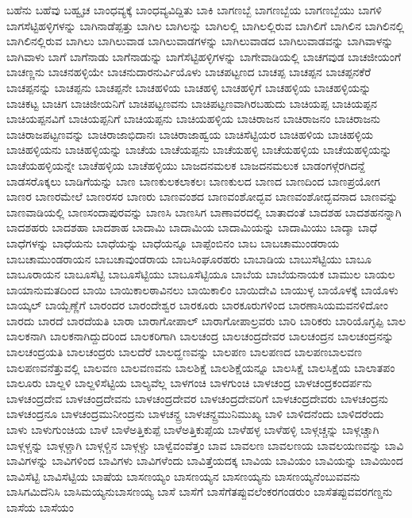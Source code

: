 {ಬಹೆನು
ಬಹೆವು
ಬಹ್ವೃಚ
ಬಾಂಧವ್ಯಕ್ಕೆ
ಬಾಂಧವ್ಯವಿದ್ದಿತು
ಬಾಕಿ
ಬಾಗಣಬ್ಬೆ
ಬಾಗಣಬ್ಬೆಯ
ಬಾಗಣಬ್ಬೆಯು
ಬಾಗಳಿ
ಬಾಗಸೆಟ್ಟಿಹಳ್ಳಿಗಳನ್ನು
ಬಾಗಿನಾಡೆಪ್ಪತ್ತು
ಬಾಗಿಲ
ಬಾಗಿಲನ್ನು
ಬಾಗಿಲಲ್ಲಿ
ಬಾಗಿಲಲ್ಲಿರುವ
ಬಾಗಿಲಿಗೆ
ಬಾಗಿಲಿನ
ಬಾಗಿಲಿನಲ್ಲಿ
ಬಾಗಿಲಿನಲ್ಲಿರುವ
ಬಾಗಿಲು
ಬಾಗಿಲುವಾಡ
ಬಾಗಿಲುವಾಡಗಳನ್ನು
ಬಾಗಿಲುವಾಡದ
ಬಾಗಿಲುವಾಡವನ್ನು
ಬಾಗಿವಾಳನ್ನು
ಬಾಗಿವಾಳು
ಬಾಗೆ
ಬಾಗೆನಾಡು
ಬಾಗೆನಾಡುನ್ನು
ಬಾಗೆಸೆಟ್ಟಿಹಳ್ಳಿಗಳನ್ನು
ಬಾಗೇವಾಡಿಯಲ್ಲಿ
ಬಾಚಗವುಡ
ಬಾಚಜೀಯಂಗೆ
ಬಾಚಣ್ಣನು
ಬಾಚನಹಳ್ಳಿಯೇ
ಬಾಚನುದಾರನುರ್ವಿಯೊಳು
ಬಾಚಪಟ್ಟಣದ
ಬಾಚಪ್ಪ
ಬಾಚಪ್ಪನ
ಬಾಚಪ್ಪನಕೆರೆ
ಬಾಚಪ್ಪನನ್ನು
ಬಾಚಪ್ಪನು
ಬಾಚಪ್ಪನೇ
ಬಾಚಹಳಿಯ
ಬಾಚಹಳ್ಳಿ
ಬಾಚಹಳ್ಳಿಗೆ
ಬಾಚಹಳ್ಳಿಯ
ಬಾಚಹಳ್ಳಿಯನ್ನು
ಬಾಚಿಕಟ್ಟ
ಬಾಚಿಗ
ಬಾಚಿಜೀಯನಿಗೆ
ಬಾಚಿಪಟ್ಟಣವನು
ಬಾಚಿಪಟ್ಟಣವಾಗಿರಬಹುದು
ಬಾಚಿಯಪ್ಪ
ಬಾಚಿಯಪ್ಪನ
ಬಾಚಿಯಪ್ಪನವಿಗೆ
ಬಾಚಿಯಪ್ಪನಿಗೆ
ಬಾಚಿಯಪ್ಪನು
ಬಾಚಿಯಹಳ್ಳಿಯ
ಬಾಚಿರಾಜನ
ಬಾಚಿರಾಜನಂ
ಬಾಚಿರಾಜನು
ಬಾಚಿರಾಜಪಟ್ಟಣವನ್ನು
ಬಾಚಿರಾಜಾಭಿದಾನಃ
ಬಾಚಿರಾಜಾಹ್ವಯ
ಬಾಚಿಸೆಟ್ಟಿಯರ
ಬಾಚಿಹಳಿಯ
ಬಾಚಿಹಳ್ಳಿಯ
ಬಾಚಿಹಳ್ಳಿಯನು
ಬಾಚಿಹಳ್ಳಿಯನ್ನು
ಬಾಚೆಯ
ಬಾಚೆಯಪ್ಪನು
ಬಾಚೆಯಹಳ್ಳಿ
ಬಾಚೆಯಹಳ್ಳಿಯ
ಬಾಚೆಯಹಳ್ಳಿಯನ್ನು
ಬಾಚೆಯಹಳ್ಳಿಯನ್ನೇ
ಬಾಚೆಹಳ್ಳಿಯ
ಬಾಚೆಹಳ್ಳಿಯು
ಬಾಜದನಮಲಕ
ಬಾಜದನಮಲುಕ
ಬಾಡಂಗಳ್ಗೆರಗಿದನ್ದೆ
ಬಾಡಸರೊಕ್ಕಲು
ಬಾಡಿಗೆಯನ್ನು
ಬಾಣ
ಬಾಣಕುಲಕಲಾಕಲಃ
ಬಾಣಕುಲದ
ಬಾಣದ
ಬಾಣದಿಂದ
ಬಾಣಪ್ರಯೋಗ
ಬಾಣರ
ಬಾಣರಮೇಲೆ
ಬಾಣರಸರ
ಬಾಣರು
ಬಾಣವಂಶದ
ಬಾಣವಂಶೋದ್ಭವ
ಬಾಣವಂಶೋದ್ಭವನಾದ
ಬಾಣವನ್ನು
ಬಾಣವಾಡಿಯಲ್ಲಿ
ಬಾಣಸಂದಾಪುರವನ್ನು
ಬಾಣಸಿ
ಬಾಣಸಿಗ
ಬಾಣಾವರದಲ್ಲಿ
ಬಾತಾದಂತೆ
ಬಾದಶಹ
ಬಾದಶಹನನ್ನಾಗಿ
ಬಾದಶಹರು
ಬಾದಶಹಾ
ಬಾದಶಾಹ
ಬಾದಾಮಿ
ಬಾದಾಮಿಯ
ಬಾದಾಮಿಯನ್ನು
ಬಾದಾಮಿಯು
ಬಾದ್ಶಾ
ಬಾಧೆ
ಬಾಧೆಗಳನ್ನು
ಬಾಧೆಯನು
ಬಾಧೆಯನ್ನು
ಬಾಧೆಯನ್ನೂ
ಬಾಪ್ಪೆಂಬಿನಂ
ಬಾಬ
ಬಾಬಚಾಮುಂಡರಾಯ
ಬಾಬಚಾಮುಂಡರಾಯನ
ಬಾಬಚಾವುಂಡರಾಯ
ಬಾಬಸಿಂಘೂರಹರು
ಬಾಬಾಡಿಯ
ಬಾಬುಸೆಟ್ಟಿಯು
ಬಾಬೂ
ಬಾಬೂರಾಯನ
ಬಾಬೂಸೆಟ್ಟಿ
ಬಾಬೂಸೆಟ್ಟಿಯು
ಬಾಬೂಸೆಟ್ಟಿಯೂ
ಬಾಬೆಯ
ಬಾಬೆಯನಾಯಕ
ಬಾಮುಲ
ಬಾಯಲ
ಬಾಯಾನುಮತದಿಂದ
ಬಾಯಿ
ಬಾಯಿಕಾಲಠಾವಿನಲು
ಬಾಯಿಕಾಲಿಂ
ಬಾಯಿದೇವಿ
ಬಾಯುಳ್ಳ
ಬಾಯೊಳಕ್ಕೆ
ಬಾಯೊಳು
ಬಾಯ್ಕಲ್
ಬಾಯ್ಬೆಣ್ಣೆಗೆ
ಬಾರಂದರ
ಬಾರಂದೇಶ್ವರ
ಬಾರಕೂರು
ಬಾರಕೂರುಗಳಿಂದ
ಬಾರಣಾಸಿಯಮವನಳಿದೋಂ
ಬಾರದು
ಬಾರದೆ
ಬಾರದೆಯತಿ
ಬಾರಾ
ಬಾರಾಗೋಪಾಲ್
ಬಾರಾಗೋಪಾಲ್ರವರು
ಬಾರಿ
ಬಾರಿಕರು
ಬಾರಿಯೊಗ್ಳಪ್ಪಿ
ಬಾಲ
ಬಾಲಕನಾಗಿ
ಬಾಲಕನಾಗಿದ್ದುದರಿಂದ
ಬಾಲಕರಿಗಾಗಿ
ಬಾಲಚಂದ್ರ
ಬಾಲಚಂದ್ರದೇವರ
ಬಾಲಚಂದ್ರನ
ಬಾಲಚಂದ್ರನನ್ನು
ಬಾಲಚಂದ್ರಯತಿ
ಬಾಲಚಂದ್ರರು
ಬಾಲದೆರೆ
ಬಾಲದ್ಹಣವನ್ನು
ಬಾಲಪಣ
ಬಾಲಪಣದ
ಬಾಲಪಣಬಾಲವಣ
ಬಾಲಪಣವನೆತ್ತುವಲ್ಲಿ
ಬಾಲವಣ
ಬಾಲವಣವನು
ಬಾಲಶಿಕ್ಷೆ
ಬಾಲಶಿಕ್ಷೆಯನ್ನೂ
ಬಾಲಸಿಕ್ಷೆ
ಬಾಲಸಿಕ್ಷೆಯ
ಬಾಲಾತಪಂ
ಬಾಲೂರು
ಬಾಲ್ದಳಿ
ಬಾಲ್ದಳಿಸೆಟ್ಟಿಯ
ಬಾಲ್ಯವೆಲ್ಲ
ಬಾಳಗಂಚಿ
ಬಾಳಗುಂಚಿ
ಬಾಳಚಂದ್ರ
ಬಾಳಚಂದ್ರಕಂದರ್ಪನು
ಬಾಳಚಂದ್ರದೇವ
ಬಾಳಚಂದ್ರದೇವನು
ಬಾಳಚಂದ್ರದೇವರ
ಬಾಳಚಂದ್ರದೇವರಿಗೆ
ಬಾಳಚಂದ್ರದೇವರು
ಬಾಳಚಂದ್ರನು
ಬಾಳಚಂದ್ರನೂ
ಬಾಳಚಂದ್ರಮುನೀಂದ್ರನು
ಬಾಳಚನ್ದ್ರ
ಬಾಳಚನ್ದ್ರಮುನಿಮುಖ್ಯ
ಬಾಳಿ
ಬಾಳಿದನೆಂದು
ಬಾಳಿದರೆಂದು
ಬಾಳು
ಬಾಳುಗುಂಚಿಯ
ಬಾಳೆ
ಬಾಳೆಅತ್ತಿಕುಪ್ಪೆ
ಬಾಳೆಅತ್ತಿಕುಪ್ಪೆಯ
ಬಾಳೆಹಳ್ಳ
ಬಾಳೆಹಳ್ಳಿ
ಬಾಳ್ಗಚ್ಚನ್ನು
ಬಾಳ್ಗಚ್ಚಾಗಿ
ಬಾಳ್ಗಳ್ಚನ್ನು
ಬಾಳ್ಗಳ್ಚಾಗಿ
ಬಾಳ್ಗಳ್ಚಿನ
ಬಾಳ್ಗಳ್ಚು
ಬಾಳ್ವೆವಂವೆತ್ತಂ
ಬಾವ
ಬಾವಲಣ
ಬಾವಲಣಯ
ಬಾವಲಯಣವನ್ನು
ಬಾವಿ
ಬಾವಿಗಳನ್ನು
ಬಾವಿಗಳಿಂದ
ಬಾವಿಗಳು
ಬಾವಿಗಳೆಂದು
ಬಾವಿತ್ತೆಯದಕ್ಕ
ಬಾವಿಯ
ಬಾವಿಯಂ
ಬಾವಿಯನ್ನು
ಬಾವಿಯಿಂದ
ಬಾವಿಸೆಟ್ಟಿ
ಬಾವಿಸೆಟ್ಟಿಯ
ಬಾಷೆಯ
ಬಾಸಣಯ್ಯಂ
ಬಾಸಣಯ್ಯನ
ಬಾಸಣಯ್ಯನು
ಬಾಸಣಯ್ಯನೆಂಬುವವನು
ಬಾಸಿಗಮಿದೆನಿಸಿ
ಬಾಸಿಮಯ್ಯನುಬಾಸಣಯ್ಯ
ಬಾಸೆ
ಬಾಸೆಗೆ
ಬಾಸೆಗೆತಪ್ಪುವಲೆಂಕರಗಂಡರುಂ
ಬಾಸೆತಪ್ಪುವವರಗಣ್ಡನು
ಬಾಸೆಯ
ಬಾಸೆಯಂ
}
